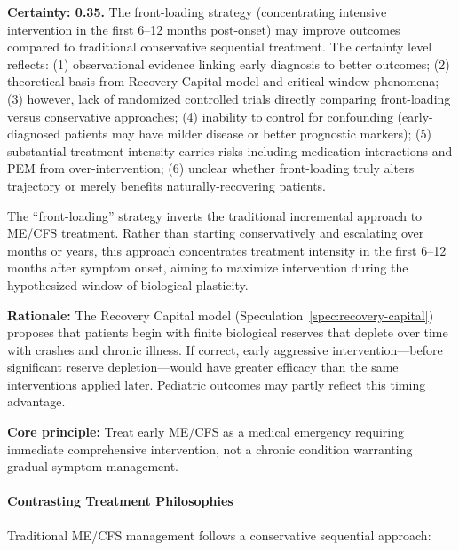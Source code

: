 \begin{hypothesis}
\label{hyp:front-loading-intensity}

\textbf{Certainty: 0.35.} The front-loading strategy (concentrating intensive intervention in the first 6--12 months post-onset) may improve outcomes compared to traditional conservative sequential treatment. The certainty level reflects: (1) observational evidence linking early diagnosis to better outcomes; (2) theoretical basis from Recovery Capital model and critical window phenomena; (3) however, lack of randomized controlled trials directly comparing front-loading versus conservative approaches; (4) inability to control for confounding (early-diagnosed patients may have milder disease or better prognostic markers); (5) substantial treatment intensity carries risks including medication interactions and PEM from over-intervention; (6) unclear whether front-loading truly alters trajectory or merely benefits naturally-recovering patients.

The ``front-loading'' strategy inverts the traditional incremental approach to ME/CFS treatment. Rather than starting conservatively and escalating over months or years, this approach concentrates treatment intensity in the first 6--12 months after symptom onset, aiming to maximize intervention during the hypothesized window of biological plasticity.

\textbf{Rationale:} The Recovery Capital model (Speculation~\ref{spec:recovery-capital}) proposes that patients begin with finite biological reserves that deplete over time with crashes and chronic illness. If correct, early aggressive intervention---before significant reserve depletion---would have greater efficacy than the same interventions applied later. Pediatric outcomes may partly reflect this timing advantage.

\textbf{Core principle:} Treat early ME/CFS as a medical emergency requiring immediate comprehensive intervention, not a chronic condition warranting gradual symptom management.
\end{hypothesis}

\paragraph{Contrasting Treatment Philosophies}

Traditional ME/CFS management follows a conservative sequential approach:

